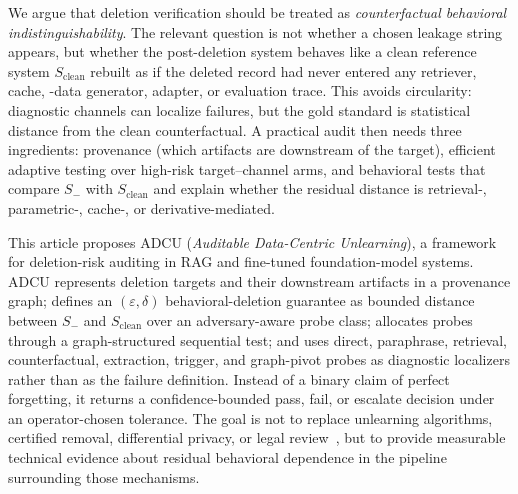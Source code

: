 \documentclass[10pt,journal,compsoc]{IEEEtran}
\newcommand{\method}{ADCU}
\begin{document}
We argue that deletion verification should be treated as \emph{counterfactual behavioral indistinguishability}. The relevant question is not whether a chosen leakage string appears, but whether the post-deletion system behaves like a clean reference system $S_{\mathrm{clean}}$ rebuilt as if the deleted record had never entered any retriever, cache, -data generator, adapter, or evaluation trace. This avoids circularity: diagnostic channels can localize failures, but the gold standard is statistical distance from the clean counterfactual. A practical audit then needs three ingredients: provenance (which artifacts are downstream of the target), efficient adaptive testing over high-risk target--channel arms, and behavioral tests that compare $S_-$ with $S_{\mathrm{clean}}$ and explain whether the residual distance is retrieval-, parametric-, cache-, or derivative-mediated.

This article proposes \method{} (\emph{Auditable Data-Centric Unlearning}), a framework for deletion-risk auditing in RAG and fine-tuned foundation-model systems. \method{} represents deletion targets and their downstream artifacts in a provenance graph; defines an $(\varepsilon,\delta)$ behavioral-deletion guarantee as bounded distance between $S_-$ and $S_{\mathrm{clean}}$ over an adversary-aware probe class; allocates probes through a graph-structured sequential test; and uses direct, paraphrase, retrieval, counterfactual, extraction, trigger, and graph-pivot probes as diagnostic localizers rather than as the failure definition. Instead of a binary claim of perfect forgetting, it returns a confidence-bounded pass, fail, or escalate decision under an operator-chosen tolerance. The goal is not to replace unlearning algorithms, certified removal, differential privacy, or legal review~\cite{dwork2006dp,guo2020certified,kirchenbauer2023watermark}, but to provide measurable technical evidence about residual behavioral dependence in the pipeline surrounding those mechanisms.
\end{document}
